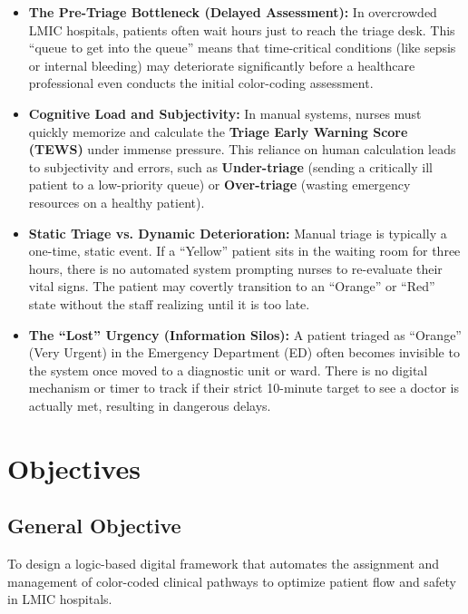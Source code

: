 \documentclass[12pt, a4paper]{article}
\begin{document}
	\begin{itemize}
		\item \textbf{The Pre-Triage Bottleneck (Delayed Assessment):} In overcrowded LMIC hospitals, patients often wait hours just to reach the triage desk. This ``queue to get into the queue'' means that time-critical conditions (like sepsis or internal bleeding) may deteriorate significantly before a healthcare professional even conducts the initial color-coding assessment.
		
		\item \textbf{Cognitive Load and Subjectivity:} In manual systems, nurses must quickly memorize and calculate the \textbf{Triage Early Warning Score (TEWS)} under immense pressure. This reliance on human calculation leads to subjectivity and errors, such as \textbf{Under-triage} (sending a critically ill patient to a low-priority queue) or \textbf{Over-triage} (wasting emergency resources on a healthy patient).
		
		\item \textbf{Static Triage vs. Dynamic Deterioration:} Manual triage is typically a one-time, static event. If a ``Yellow'' patient sits in the waiting room for three hours, there is no automated system prompting nurses to re-evaluate their vital signs. The patient may covertly transition to an ``Orange'' or ``Red'' state without the staff realizing until it is too late.
		
		\item \textbf{The ``Lost'' Urgency (Information Silos):} A patient triaged as ``Orange'' (Very Urgent) in the Emergency Department (ED) often becomes invisible to the system once moved to a diagnostic unit or ward. There is no digital mechanism or timer to track if their strict 10-minute target to see a doctor is actually met, resulting in dangerous delays.
	\end{itemize}
	
	\section{Objectives}
	\subsection*{General Objective}
	To design a logic-based digital framework that automates the assignment and management of color-coded clinical pathways to optimize patient flow and safety in LMIC hospitals.
	
\end{document}
